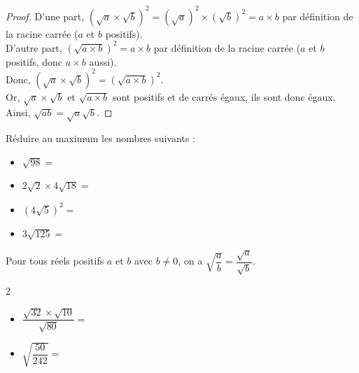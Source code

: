 \begin{proof}
D'une part, $\left(\sqrt{a}\times \sqrt{b}\right)^2=\left(\sqrt{a}\right)^2\times \left(\sqrt{b}\right)^2=a\times b$ par définition de la racine carrée ($a$ et $b$ positifs).\\
D'autre part, $\left(\sqrt{a\times b}\right)^2=a\times b$ par définition de la racine carrée ($a$ et $b$ positifs, donc $a\times b$ aussi).\\
Donc, $\left(\sqrt{a}\times \sqrt{b}\right)^2=\left(\sqrt{a\times b}\right)^2$. \\
Or, $\sqrt{a}\times \sqrt{b}$ et $\sqrt{a\times b}$ sont positifs et de carrés égaux, ils sont donc égaux.\\ Ainsi, $\sqrt{ab}=\sqrt{a}\sqrt{b}$.

\end{proof}
\vspace{-0,5cm}
\begin{Exemple}
Réduire au maximum les nombres suivants :
\begin{itemize}[label=\textcolor{Couleur8}{$\bullet$}]
\item $\sqrt{98}=$ \ligne

\item $2\sqrt{2}\times 4\sqrt{18}=$ \ligne

\item $\left(4\sqrt{5}\right)^2=$ \ligne

\item $3\sqrt{125}=$ \ligne

\end{itemize}

\end{Exemple}


\begin{Propriété}
Pour tous réels positifs $a$ et $b$ avec $b\neq 0$, on a $\sqrt{\dfrac{a}{b}}=\dfrac{\sqrt{a}}{\sqrt{b}}$.
\end{Propriété}



\begin{Exemple}
\leavevmode\vspace{-\baselineskip}
\begin{multicols}{2}
\begin{itemize}[label=\textcolor{Couleur8}{$\bullet$}]
\item $\dfrac{\sqrt{32}\times\sqrt{10}}{\sqrt{80}}=$ \ligne

\item $\sqrt{\dfrac{50}{242}}=$ \ligne

\end{itemize}
\end{multicols}
\end{Exemple}

